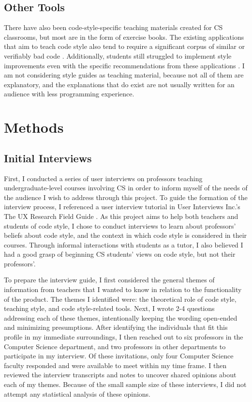 \documentclass[10pt,twocolumn]{article}
\begin{document}
\subsection{Other Tools}
There have also been code-style-specific teaching materials created for CS classrooms, but most are in the form of exercise books. 
The existing applications that aim to teach code style also tend to require a significant corpus of similar \cite{moghadam_2015} or verifiably bad code \cite{mcmaster_2013}. 
Additionally, students still struggled to implement style improvements even with the specific recommendations from these applications \cite{wiese_2017}. 
I am not considering style guides as teaching material, because not all of them are explanatory, and the explanations that do exist are not usually written for an audience with less programming experience. 


\section{Methods}
\subsection{Initial Interviews}
First, I conducted a series of user interviews on professors teaching undergraduate-level courses involving CS in order to inform myself of the needs of the audience I wish to address through this project. 
To guide the formation of the interview process, I referenced a user interview tutorial in User Interviews Inc.'s The UX Research Field Guide \cite{interview_tutorial}. 
As this project aims to help both teachers and students of code style, I chose to conduct interviews to learn about professors' beliefs about code style, and the context in which code style is considered in their courses. 
Through informal interactions with students as a tutor, I also believed I had a good grasp of beginning CS students' views on code style, but not their professors'.

To prepare the interview guide, I first considered the general themes of information from teachers that I wanted to know in relation to the functionality of the product. 
The themes I identified were: the theoretical role of code style, teaching style, and code style-related tools. 
Next, I wrote 2-4 questions addressing each of these themes, intentionally keeping the wording open-ended and minimizing presumptions. 
After identifying the individuals that fit this profile in my immediate surroundings, I then reached out to six professors in the Computer Science department, and two professors in other departments to participate in my interview. 
Of these invitations, only four Computer Science faculty responded and were available to meet within my time frame. 
I then reviewed the interview transcripts and notes to uncover shared opinions about each of my themes.
Because of the small sample size of these interviews, I did not attempt any statistical analysis of these opinions. 
\end{document}
